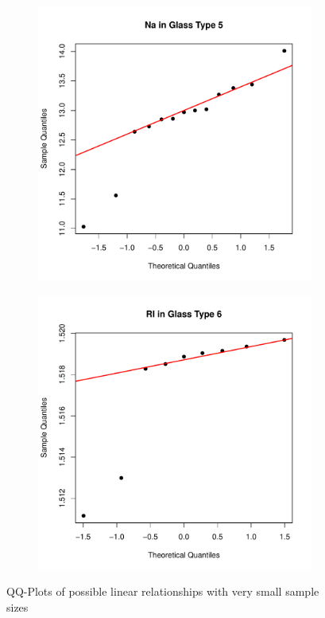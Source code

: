 \documentclass[a4paper, 12pt, titlepage, headsepline, listof = totoc, bibliography = totoc, numbers = noenddot]{scrartcl}
\begin{document}
\begin{figure}[H]
\centering
\begin{subfigure}{.5\textwidth}
  \centering
  \includegraphics[width=\linewidth]{report-QQsampleslin2a}
  \vspace{-1cm}
  \caption{}
  \label{fig:QQsampleslin2a}
\end{subfigure}%
\begin{subfigure}{.5\textwidth}
  \centering
  \includegraphics[width=\linewidth]{report-QQsampleslin2b}
  \vspace{-1cm}
  \caption{}
  \label{fig:QQsampleslin2b}
\end{subfigure}
\caption{QQ-Plots of possible linear relationships with very small sample sizes}
\label{fig:QQsampleslin2}
\end{figure}
\end{document}
